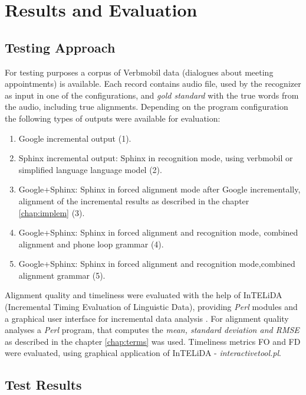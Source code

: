 \chapter{Results and Evaluation}
\label{chap:res}
 \section {Testing Approach} 
For testing purposes  a corpus of  Verbmobil data (dialogues about meeting
appointments)  is available.  Each record contains audio file, used by the recognizer as input in
one of the configurations,  and \textit {gold standard}
with the true words from the audio, including true alignments.  Depending on the program configuration 
 the following types of outputs were available for evaluation:
\begin {enumerate}
  \item Google incremental output (1).
  \item Sphinx incremental output: Sphinx in recognition mode, using verbmobil
  or simplified language language model (2).
  \item Google+Sphinx: Sphinx in forced alignment mode after Google
  incrementally, alignment of the incremental results as described in the
  chapter \ref {chap:implem} (3).
  \item Google+Sphinx: Sphinx in forced alignment and recognition mode,
  combined alignment and phone loop grammar (4).
  \item Google+Sphinx: Sphinx in forced alignment and recognition mode,combined
  alignment grammar (5). 
\end{enumerate}
Alignment quality and timeliness were evaluated with the help of InTELiDA
(Incremental Timing Evaluation of Linguistic Data), providing \textit {Perl}
modules and a graphical user interface for incremental data analysis \parencite {baumann2013:phd}. For
alignment quality analyses a \textit {Perl} program, that computes the \textit {mean,
standard deviation and RMSE} as described in the chapter
\ref{chap:terms} was used. Timeliness metrics FO and FD were
evaluated, using graphical application of InTELiDA - \textit {interactivetool.pl}. 

\section {Test Results} 
